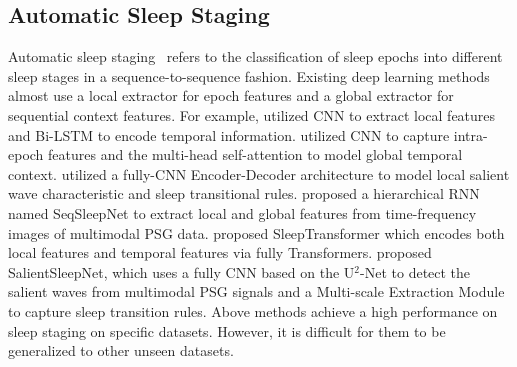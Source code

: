 \documentclass[letterpaper]{article} %
\begin{document}
	\subsection{Automatic Sleep Staging}
	Automatic sleep staging~\citep{melek2021automatic} refers to the classification of sleep epochs into different sleep stages in a sequence-to-sequence fashion.
	Existing deep learning methods almost use a local extractor for epoch features and a global extractor for sequential context features.
	For example, \citet{Supratak2017DeepSleepNetAM, Supratak2020TinySleepNetAE} utilized CNN to extract local features and Bi-LSTM to encode temporal information.
	\citet{Qu2020ARB, Eldele2021AnAD, wang2023narcolepsy} utilized CNN to capture intra-epoch features and the multi-head self-attention to model global temporal context.
	\citet{Perslev2019UTimeAF} utilized a fully-CNN Encoder-Decoder architecture to model local salient wave characteristic and sleep transitional rules. 
	\citet{Phan2019SeqSleepNetEH} proposed a hierarchical RNN named SeqSleepNet to extract local and global features from time-frequency images of multimodal PSG data.
	\citet{Phan2022SleepTransformerAS} proposed SleepTransformer which encodes both local features and temporal features via fully Transformers.
	\citet{Jia2021SalientSleepNetMS} proposed SalientSleepNet, which uses a fully CNN based on the U$^2$-Net to detect the salient waves from multimodal PSG signals and a Multi-scale Extraction Module to capture sleep transition rules.
	Above methods achieve a high performance on sleep staging on specific datasets.
	However, it is difficult for them to be generalized to other unseen datasets.
	
\end{document}
